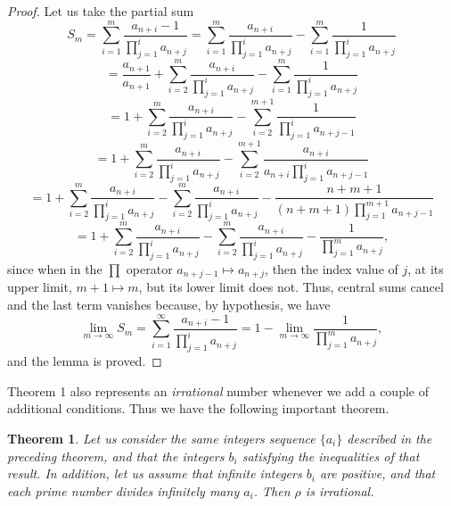 \documentclass[12pt]{article}
\newtheorem{theorem}{Theorem}
\begin{document}
\begin{proof}
Let us take the partial sum
\begin{equation*}
S_m = \sum_{i=1}^m \frac{a_{n+i}-1}{\prod_{j=1}^i a_{n+j}} = \sum_{i=1}^m \frac{a_{n+i}}{\prod_{j=1}^i a_{n+j}} -  \sum_{i=1}^m \frac{1}{\prod_{j=1}^i a_{n+j}}
\end{equation*}
\begin{equation*}
= \frac{a_{n+1}}{a_{n+1}} + \sum_{i=2}^m \frac{a_{n+i}}{\prod_{j=1}^i a_{n+j}} - \sum_{i=1}^m \frac{1}{\prod_{j=1}^i a_{n+j}}
\end{equation*} 
\begin{equation*}
= 1 + \sum_{i=2}^m \frac{a_{n+i}}{\prod_{j=1}^i a_{n+j}} - \sum_{i=2}^{m+1} \frac{1}{\prod_{j=1}^i a_{n+j-1}}
\end{equation*} 
\begin{equation*}
= 1 + \sum_{i=2}^m \frac{a_{n+i}}{\prod_{j=1}^i a_{n+j}} - \sum_{i=2}^{m+1} \frac{a_{n+i}}{a_{n+i}\prod_{j=1}^i a_{n+j-1}}
\end{equation*} 
\begin{equation*}
= 1 + \sum_{i=2}^m \frac{a_{n+i}}{\prod_{j=1}^i a_{n+j}} - \sum_{i=2}^{m} \frac{a_{n+i}}{\prod_{j=1}^i a_{n+j}} - \frac{n+m+1}{(n+m+1)\prod_{j=1}^{m+1} a_{n+j-1}}
\end{equation*}
\begin{equation*}
= 1 +  \sum_{i=2}^m \frac{a_{n+i}}{\prod_{j=1}^i a_{n+j}} - \sum_{i=2}^{m} \frac{a_{n+i}}{\prod_{j=1}^i a_{n+j}} - \frac{1}{\prod_{j=1}^m a_{n+j}},  
\end{equation*}
since when in the $\prod$ operator $a_{n+j-1}\mapsto a_{n+j}$, then the index value of $j$, at its upper limit, $m+1\mapsto m$, but its lower limit does not. Thus, central sums cancel and the last term vanishes because, by hypothesis, we have
\begin{equation*}
\lim_{m\to\infty} S_m = \sum_{i=1}^\infty \frac{a_{n+i}-1}{\prod_{j=1}^i a_{n+j}} = 1 - \lim_{m\to\infty}\frac{1}{\prod_{j=1}^m a_{n+j}},
\end{equation*} 
and the lemma is proved. 
\end{proof} 
Theorem 1 also represents an \emph{irrational} number whenever we add a couple of additional conditions. Thus we have the following important theorem.
\begin{theorem}
Let us consider the same integers sequence $\{a_i\}$ described in the preceding theorem, and that the integers $b_i$ satisfying the inequalities of that result. In addition, let us assume that infinite integers $b_i$ are positive, and that each \emph{prime number} divides infinitely many $a_i$. Then $\rho$ is irrational.
\end{theorem}
\end{document}
